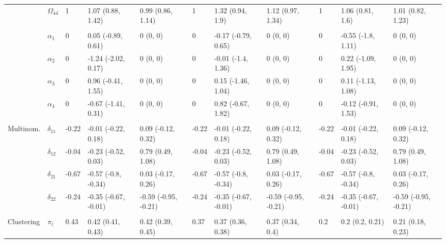 \documentclass{article}
\begin{document}
\begin{landscape}
\begin{table}[t]
\begin{tabular}{lllllllllll}
\hspace{1em} & $\Omega_{44}$ & 1 & 1.07 (0.88, 1.42) & 0.99 (0.86, 1.14) & 1 & 1.32 (0.94, 1.9) & 1.12 (0.97, 1.34) & 1 & 1.06 (0.81, 1.6) & 1.01 (0.82, 1.23)\\
\addlinespace[0.3em]
\multicolumn{11}{l}{\textbf{ }}\\
\hspace{1em} & $\alpha_{1}$ & 0 & 0.05 (-0.89, 0.61) & 0 (0, 0) & 0 & -0.17 (-0.79, 0.65) & 0 (0, 0) & 0 & -0.55 (-1.8, 1.11) & 0 (0, 0)\\
\hspace{1em} & $\alpha_{2}$ & 0 & -1.24 (-2.02, 0.17) & 0 (0, 0) & 0 & -0.01 (-1.4, 1.36) & 0 (0, 0) & 0 & 0.22 (-1.09, 1.95) & 0 (0, 0)\\
\hspace{1em} & $\alpha_{3}$ & 0 & 0.96 (-0.41, 1.55) & 0 (0, 0) & 0 & 0.15 (-1.46, 1.04) & 0 (0, 0) & 0 & 0.11 (-1.13, 1.08) & 0 (0, 0)\\
\hspace{1em} & $\alpha_{4}$ & 0 & -0.67 (-1.41, 0.31) & 0 (0, 0) & 0 & 0.82 (-0.67, 1.82) & 0 (0, 0) & 0 & -0.12 (-0.91, 1.53) & 0 (0, 0)\\
\addlinespace[0.3em]
\multicolumn{11}{l}{\textbf{ }}\\
\hspace{1em}Multinom. & $\delta_{11}$ & -0.22 & -0.01 (-0.22, 0.18) & 0.09 (-0.12, 0.32) & -0.22 & -0.01 (-0.22, 0.18) & 0.09 (-0.12, 0.32) & -0.22 & -0.01 (-0.22, 0.18) & 0.09 (-0.12, 0.32)\\
\hspace{1em} & $\delta_{12}$ & -0.04 & -0.23 (-0.52, 0.03) & 0.79 (0.49, 1.08) & -0.04 & -0.23 (-0.52, 0.03) & 0.79 (0.49, 1.08) & -0.04 & -0.23 (-0.52, 0.03) & 0.79 (0.49, 1.08)\\
\hspace{1em} & $\delta_{21}$ & -0.67 & -0.57 (-0.8, -0.34) & 0.03 (-0.17, 0.26) & -0.67 & -0.57 (-0.8, -0.34) & 0.03 (-0.17, 0.26) & -0.67 & -0.57 (-0.8, -0.34) & 0.03 (-0.17, 0.26)\\
\hspace{1em} & $\delta_{22}$ & -0.24 & -0.35 (-0.67, -0.01) & -0.59 (-0.95, -0.21) & -0.24 & -0.35 (-0.67, -0.01) & -0.59 (-0.95, -0.21) & -0.24 & -0.35 (-0.67, -0.01) & -0.59 (-0.95, -0.21)\\
\addlinespace[0.3em]
\multicolumn{11}{l}{\textbf{ }}\\
\hspace{1em}Clustering & $\pi_l$ & 0.43 & 0.42 (0.41, 0.43) & 0.42 (0.39, 0.45) & 0.37 & 0.37 (0.36, 0.38) & 0.37 (0.34, 0.4) & 0.2 & 0.2 (0.2, 0.21) & 0.21 (0.18, 0.23)\\
\bottomrule
\end{tabular}
\end{table}
\end{landscape}
\end{document}
